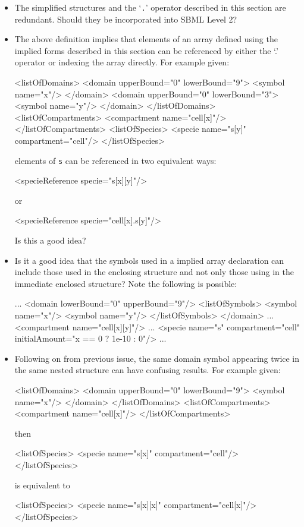 \documentclass{cekarticle}
\begin{document}
\begin{itemize}
\item
The simplified structures and the `\texttt{.}' operator
described in this section are redundant.  Should they be
incorporated into SBML Level 2?
\item
The above definition implies that elements of an array defined using the implied forms
described in this section can be referenced by either the `.' operator or indexing the array directly.
For example given:
\begin{example}
<listOfDomains>
    <domain upperBound="0" lowerBound="9">
        <symbol name="x"/>
    </domain>
    <domain upperBound="0" lowerBound="3">
        <symbol name="y"/>
    </domain>
</listOfDomains>
<listOfCompartments>
    <compartment name="cell[x]"/>
</listOfCompartments>
<listOfSpecies>
    <specie name="s[y]" compartment="cell"/>
</listOfSpecies>
\end{example}
elements of \texttt{s} can be referenced in two equivalent ways:
\begin{example}
<specieReference specie="s[x][y]"/>
\end{example}
or
\begin{example}
<specieReference specie="cell[x].s[y]"/>
\end{example}

Is this a good idea?

\item
Is it a good idea that the symbols used in a implied array declaration
can include those used in the enclosing structure and not only
those using in the immediate enclosed structure?
Note the following is possible:

\begin{example}
...
<domain lowerBound="0" upperBound="9"/>
    <listOfSymbols>
        <symbol name="x"/>
        <symbol name="y"/>
    </listOfSymbols>
</domain>
...
<compartment name="cell[x][y]"/>
...
<specie name="s" compartment="cell" initialAmount="x == 0 ? 1e-10 : 0"/>
...
\end{example}

\item
Following on from previous issue, the same domain symbol
appearing twice in the same nested structure can have confusing
results. For example given:
\begin{example}
<listOfDomains>
    <domain upperBound="0" lowerBound="9">
        <symbol name="x"/>
    </domain>
</listOfDomains>
<listOfCompartments>
    <compartment name="cell[x]"/>
</listOfCompartments>
\end{example}
then
\begin{example}
<listOfSpecies>
    <specie name="s[x]" compartment="cell"/>
</listOfSpecies>
\end{example}
is equivalent to
\begin{example}
<listOfSpecies>
    <specie name="s[x][x]" compartment="cell[x]"/>
</listOfSpecies>
\end{example}


\end{itemize}
\end{document}

